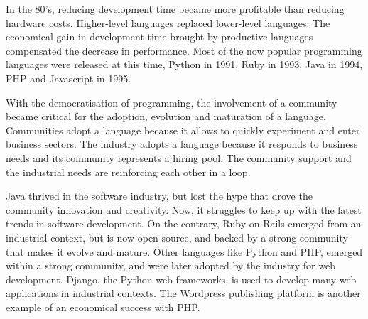 In the 80's, reducing development time became more profitable than reducing hardware costs.
Higher-level languages replaced lower-level languages.
The economical gain in development time brought by productive languages compensated the decrease in performance.
Most of the now popular programming languages were released at this time, Python in 1991, Ruby in 1993, Java in 1994, PHP and Javascript in 1995.

With the democratisation of programming, the involvement of a community became critical for the adoption, evolution and maturation of a language.
Communities adopt a language because it allows to quickly experiment and enter business sectors.
The industry adopts a language because it responds to business needs and its community represents a hiring pool.
The community support and the industrial needs are reinforcing each other in a loop.

Java thrived in the software industry, but lost the hype that drove the community innovation and creativity.
Now, it struggles to keep up with the latest trends in software development.
On the contrary, Ruby on Rails emerged from an industrial context, but is now open source, and backed by a strong community that makes it evolve and mature.
Other languages like Python and PHP, emerged within a strong community, and were later adopted by the industry for web development.
Django, the Python web frameworks, is used to develop many web applications in industrial contexts.
The Wordpress publishing platform is another example of an economical success with PHP.


